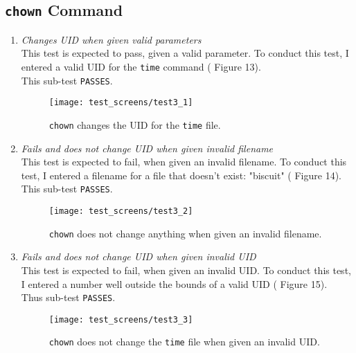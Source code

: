 \documentclass[11pt,letterpaper]{report}
\begin{document}
	\subsection{{\tt chown} Command}
	\begin{enumerate}
		\item \emph{Changes UID when given valid parameters}\\
		This test is expected to pass, given a valid parameter. To conduct this test, I entered a valid UID for the {\tt time} command ({\color{red} Figure 13}).\\
		This sub-test {\tt PASSES}.
		
		\begin{figure}
			\centering
			\texttt{[image: test\_screens/test3\_1]}
			\caption{{\tt chown} changes the UID for the {\tt time} file.}
			\label{fig:test31}
		\end{figure}
	
		\item \emph{Fails and does not change UID when given invalid filename}\\
		This test is expected to fail, when given an invalid filename. To conduct this test, I entered a filename for a file that doesn't exist: "biscuit" ({\color{red} Figure 14}).\\
		This sub-test {\tt PASSES}.
		
		\begin{figure}
			\centering
			\texttt{[image: test\_screens/test3\_2]}
			\caption{{\tt chown} does not change anything when given an invalid filename.}
			\label{fig:test32}
		\end{figure}
	
		\item \emph{Fails and does not change UID when given invalid UID}\\
		This test is expected to fail, when given an invalid UID. To conduct this test, I entered a number well outside the bounds of a valid UID ({\color{red} Figure 15}).\\
		Thus sub-test {\tt PASSES}.
		
		\begin{figure}
			\centering
			\texttt{[image: test\_screens/test3\_3]}
			\caption{{\tt chown} does not change the {\tt time} file when given an invalid UID.}
			\label{fig:test33}
		\end{figure}
		
	\end{enumerate}
	
\end{document}
